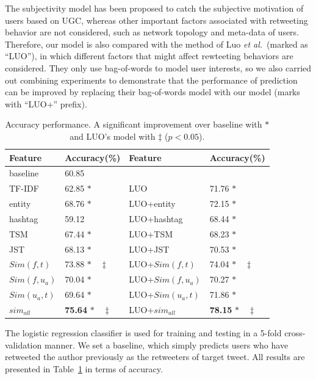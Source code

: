 \documentclass[letterpaper]{article}
\begin{document}
The subjectivity model has been proposed to catch the subjective motivation of users based on UGC, whereas other important factors associated with retweeting behavior are not considered, such as network topology and meta-data of users. 
Therefore, our model is also compared with the method of Luo \emph{et al.}~(marked as ``LUO''), in which different factors that might affect rewteeting behaviors are considered.
They only use bag-of-words to model user interests, so we also carried out combining experiments to demonstrate that the performance of prediction can be improved by replacing their bag-of-words model with our model (marks with ``LUO+'' prefix). 
\begin{table}[htb]
\scriptsize
\centering
\caption{Accuracy performance. A significant improvement over baseline with $ \ast $ and LUO's model with $ \ddagger $ ($p < 0.05$).}
\label{tab3}
\begin{tabular}{|l|l|l|l|}
\hline
Feature & Accuracy(\%) & Feature & Accuracy(\%)\\
\hline
baseline & 60.85 & & \\
\hline
TF-IDF & 62.85   $\ast$ & LUO & 71.76 $ \ast  $\\
entity & 68.76  $\ast$ & LUO+entity & 72.15 $\ast$\\
hashtag & 59.12  & LUO+hashtag & 68.44 $\ast$\\
\hline
TSM & 67.44 $\ast$ & LUO+TSM & 68.23 $\ast$\\
JST & 68.13 $\ast$ & LUO+JST & 70.53 $\ast$\\
\hline
$ Sim(f,t) $ & 73.88   $\ast  \quad \ddagger $ &LUO+$ Sim(f,t)$ & 74.04  $ \ast \quad \ddagger $\\
$ Sim(f,u_a)  $ & 70.04   $\ast  $ & LUO+$ Sim(f,u_a)$ & 70.27  $ \ast $\\
$ Sim(u_a,t)  $ & 69.64   $\ast  $ & LUO+$ Sim(u_a,t)$ & 71.86  $ \ast $\\
$ sim_{all}  $ & \textbf{75.64}   $\ast \quad \ddagger $ & LUO+$ sim_{all}  $ & \textbf{78.15}  $ \ast \quad \ddagger $\\
\hline
\end{tabular}
\end{table}

The logistic regression classifier is used for training and testing in a 5-fold cross-validation manner.
We set a baseline, which simply predicts users who have retweeted the author previously as the retweeters of target tweet. 
All results are presented in Table~\ref{tab3} in terms of accuracy.
\end{document}
